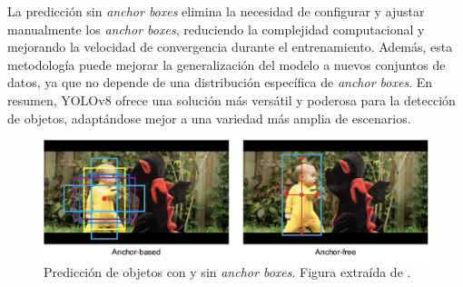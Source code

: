 La predicción sin \textit{anchor boxes} elimina la necesidad de configurar y ajustar manualmente los \textit{anchor boxes}, reduciendo la complejidad computacional y mejorando la velocidad de convergencia durante el entrenamiento. Además, esta metodología puede mejorar la generalización del modelo a nuevos conjuntos de datos, ya que no depende de una distribución específica de \textit{anchor boxes}. En resumen, YOLOv8 ofrece una solución más versátil y poderosa para la detección de objetos, adaptándose mejor a una variedad más amplia de escenarios.

\begin{figure}[H]
    \centering
    \includegraphics[width=1\textwidth]{../img/anchorfree-vs-anchorbox.png}
    \caption{Predicción de objetos con y sin \textit{anchor boxes}. Figura extraída de \cite{SiameseAnchorFree}.}
    \label{fig:anchor-box-free}
\end{figure}
